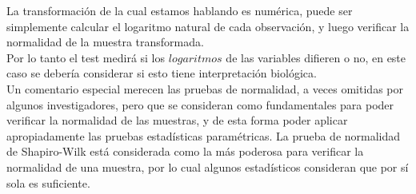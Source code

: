 \documentclass[12pt,letterpaper]{article}\usepackage[]{graphicx}\usepackage[]{color}
\begin{document}
La transformaci\'on de la cual estamos hablando es num\'erica, puede ser simplemente calcular el logaritmo natural de cada observaci\'on, y luego verificar la normalidad de la muestra transformada.\\

Por lo tanto el test medir\'a si los $logaritmos$ de las variables difieren o no, en este caso se deber\'ia considerar si esto tiene interpretaci\'on biol\'ogica.\\

Un comentario especial merecen las pruebas de normalidad, a veces omitidas por algunos 
investigadores, pero que se consideran como fundamentales para poder verificar la normalidad de las muestras, y de esta forma poder aplicar apropiadamente las pruebas estad\'isticas param\'etricas. La prueba de normalidad de Shapiro-Wilk est\'a considerada como la m\'as poderosa para verificar la normalidad de una muestra, por lo cual algunos estad\'isticos consideran que por s\'i sola es suficiente.\\
\end{document}
